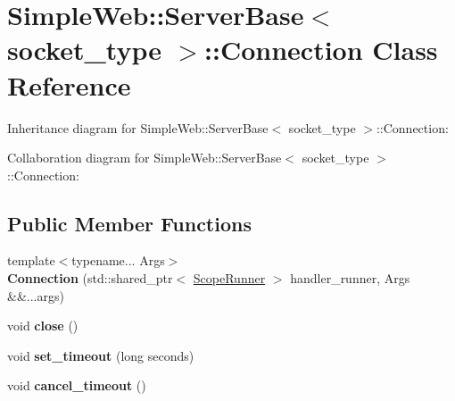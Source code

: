 \hypertarget{classSimpleWeb_1_1ServerBase_1_1Connection}{}\section{Simple\+Web\+:\+:Server\+Base$<$ socket\+\_\+type $>$\+:\+:Connection Class Reference}
\label{classSimpleWeb_1_1ServerBase_1_1Connection}


Inheritance diagram for Simple\+Web\+:\+:Server\+Base$<$ socket\+\_\+type $>$\+:\+:Connection\+:


Collaboration diagram for Simple\+Web\+:\+:Server\+Base$<$ socket\+\_\+type $>$\+:\+:Connection\+:
\subsection*{Public Member Functions}
\begin{DoxyCompactItemize}
\item 
{\footnotesize template$<$typename... Args$>$ }\\{\bfseries Connection} (std\+::shared\+\_\+ptr$<$ \hyperlink{classSimpleWeb_1_1ScopeRunner}{Scope\+Runner} $>$ handler\+\_\+runner, Args \&\&...args)\hypertarget{classSimpleWeb_1_1ServerBase_1_1Connection_a4e90e82c56d0ce9b54f879dcef0eee99}{}\label{classSimpleWeb_1_1ServerBase_1_1Connection_a4e90e82c56d0ce9b54f879dcef0eee99}

\item 
void {\bfseries close} ()\hypertarget{classSimpleWeb_1_1ServerBase_1_1Connection_a4ce156718fc82e52613a66a5de0a527f}{}\label{classSimpleWeb_1_1ServerBase_1_1Connection_a4ce156718fc82e52613a66a5de0a527f}

\item 
void {\bfseries set\+\_\+timeout} (long seconds)\hypertarget{classSimpleWeb_1_1ServerBase_1_1Connection_a877aa7e8b229b81d0a5f61d7584ba587}{}\label{classSimpleWeb_1_1ServerBase_1_1Connection_a877aa7e8b229b81d0a5f61d7584ba587}

\item 
void {\bfseries cancel\+\_\+timeout} ()\hypertarget{classSimpleWeb_1_1ServerBase_1_1Connection_a6ca0f2450663813c9a50eeba379bad6f}{}\label{classSimpleWeb_1_1ServerBase_1_1Connection_a6ca0f2450663813c9a50eeba379bad6f}

\end{DoxyCompactItemize}
